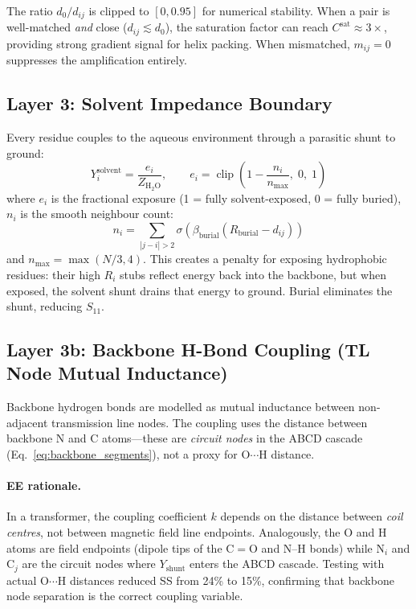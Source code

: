 The ratio $d_0/d_{ij}$ is clipped to $[0, 0.95]$ for numerical stability.  When a pair is well-matched \emph{and} close ($d_{ij} \lesssim d_0$), the saturation factor can reach $C^{\text{sat}} \approx 3\times$, providing strong gradient signal for helix packing.  When mismatched, $m_{ij} = 0$ suppresses the amplification entirely.

\subsection{Layer 3: Solvent Impedance Boundary}

Every residue couples to the aqueous environment through a parasitic shunt to ground:
\begin{equation}
    Y_i^{\text{solvent}} = \frac{e_i}{Z_{\mathrm{H_2O}}}, \qquad e_i = \operatorname{clip}\!\left(1 - \frac{n_i}{n_\text{max}},\; 0,\; 1\right)
    \label{eq:solvent_shunt}
\end{equation}
where $e_i$ is the fractional exposure (1 = fully solvent-exposed, 0 = fully buried), $n_i$ is the smooth neighbour count:
\begin{equation}
    n_i = \sum_{|j-i|>2} \sigma\!\left(\beta_\text{burial}(R_\text{burial} - d_{ij})\right)
    \label{eq:smooth_neighbors}
\end{equation}
and $n_\text{max} = \max(N/3, 4)$.  This creates a penalty for exposing hydrophobic residues: their high $R_i$ stubs reflect energy back into the backbone, but when exposed, the solvent shunt drains that energy to ground.  Burial eliminates the shunt, reducing $S_{11}$.

\subsection{Layer 3b: Backbone H-Bond Coupling (TL Node Mutual Inductance)}
\label{sec:hbond_tl_node}

Backbone hydrogen bonds are modelled as mutual inductance between non-adjacent transmission line nodes.  The coupling uses the distance between backbone N and C atoms---these are \emph{circuit nodes} in the ABCD cascade (Eq.~\ref{eq:backbone_segments}), not a proxy for O$\cdots$H distance.

\paragraph{EE rationale.}
In a transformer, the coupling coefficient $k$ depends on the distance between \emph{coil centres}, not between magnetic field line endpoints.  Analogously, the O and H atoms are field endpoints (dipole tips of the C$=$O and N--H bonds) while N$_i$ and C$_j$ are the circuit nodes where $Y_\text{shunt}$ enters the ABCD cascade.  Testing with actual O$\cdots$H distances reduced SS from 24\% to 15\%, confirming that backbone node separation is the correct coupling variable.

